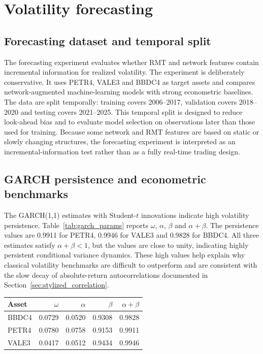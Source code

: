 \section{Volatility forecasting}
\label{sec:forecasting}

\subsection{Forecasting dataset and temporal split}

The forecasting experiment evaluates whether RMT and network features contain incremental information for realized volatility. The experiment is deliberately conservative. It uses PETR4, VALE3 and BBDC4 as target assets and compares network-augmented machine-learning models with strong econometric baselines. The data are split temporally: training covers 2006--2017, validation covers 2018--2020 and testing covers 2021--2025. This temporal split is designed to reduce look-ahead bias and to evaluate model selection on observations later than those used for training. Because some network and RMT features are based on static or slowly changing structures, the forecasting experiment is interpreted as an incremental-information test rather than as a fully real-time trading design.

\subsection{GARCH persistence and econometric benchmarks}

The GARCH(1,1) estimates with Student-$t$ innovations indicate high volatility persistence. Table~\ref{tab:garch_params} reports $\omega$, $\alpha$, $\beta$ and $\alpha+\beta$. The persistence values are 0.9911 for PETR4, 0.9946 for VALE3 and 0.9828 for BBDC4. All three estimates satisfy $\alpha+\beta<1$, but the values are close to unity, indicating highly persistent conditional variance dynamics. These high values help explain why classical volatility benchmarks are difficult to outperform and are consistent with the slow decay of absolute-return autocorrelations documented in Section~\ref{sec:stylized_correlation}.

\begin{center}
\label{tab:garch_params}
\begin{tabular}{lrrrr}
\toprule
Asset & $\omega$ & $\alpha$ & $\beta$ & $\alpha+\beta$ \\
\midrule
BBDC4 & 0.0729 & 0.0520 & 0.9308 & 0.9828 \\
PETR4 & 0.0780 & 0.0758 & 0.9153 & 0.9911 \\
VALE3 & 0.0417 & 0.0512 & 0.9434 & 0.9946 \\
\bottomrule
\end{tabular}
\end{center}

